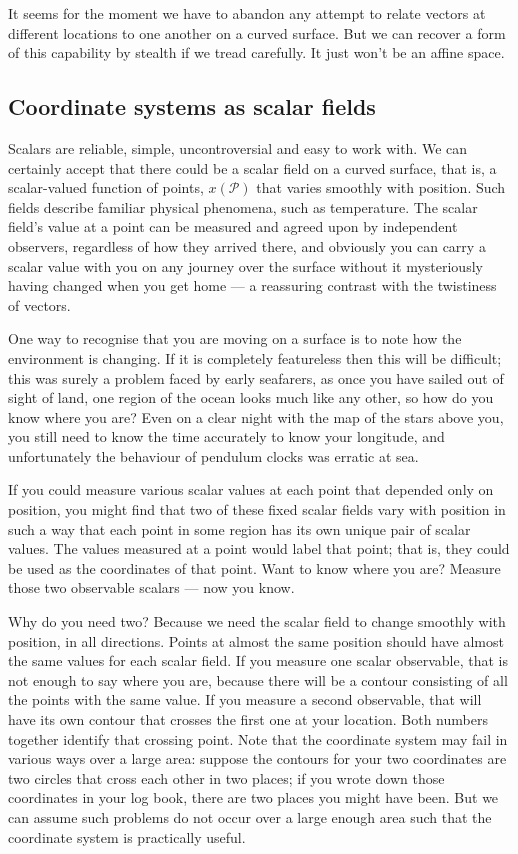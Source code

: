It seems for the moment we have to abandon any attempt to relate vectors at different locations to one another on a curved surface. But we can recover a form of this capability by stealth if we tread carefully. It just won't be an affine space.

\subsection{Coordinate systems as scalar fields}

Scalars are reliable, simple, uncontroversial and easy to work with. We can certainly accept that there could be a scalar field on a curved surface, that is, a scalar-valued function of points, $x(\mathcal{P})$ that varies smoothly with position. Such fields describe familiar physical phenomena, such as temperature. The scalar field's value at a point can be measured and agreed upon by independent observers, regardless of how they arrived there, and obviously you can carry a scalar value with you on any journey over the surface without it mysteriously having changed when you get home --- a reassuring contrast with the twistiness of vectors.

One way to recognise that you are moving on a surface is to note how the environment is changing. If it is completely featureless then this will be difficult; this was surely a problem faced by early seafarers, as once you have sailed out of sight of land, one region of the ocean looks much like any other, so how do you know where you are? Even on a clear night with the map of the stars above you, you still need to know the time accurately to know your longitude, and unfortunately the behaviour of pendulum clocks was erratic at sea.

If you could measure various scalar values at each point that depended only on position, you might find that two of these fixed scalar fields vary with position in such a way that each point in some region has its own unique pair of scalar values. The values measured at a point would label that point; that is, they could be used as the coordinates of that point. Want to know where you are? Measure those two observable scalars --- now you know.

Why do you need two? Because we need the scalar field to change smoothly with position, in all directions. Points at almost the same position should have almost the same values for each scalar field. If you measure one scalar observable, that is not enough to say where you are, because there will be a contour consisting of all the points with the same value. If you measure a second observable, that will have its own contour that crosses the first one at your location. Both numbers together identify that crossing point. Note that the coordinate system may fail in various ways over a large area: suppose the contours for your two coordinates are two circles that cross each other in two places; if you wrote down those coordinates in your log book, there are two places you might have been. But we can assume such problems do not occur over a large enough area such that the coordinate system is practically useful.

